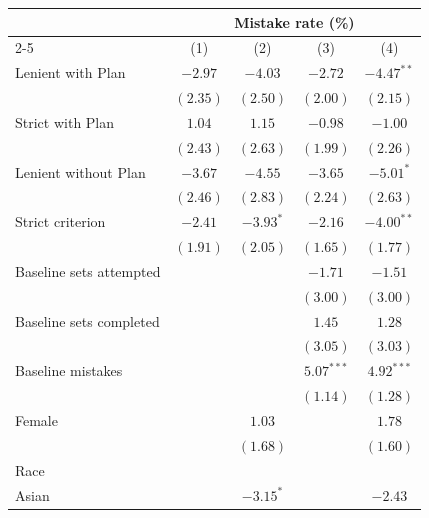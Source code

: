 \begin{tabular}{l c c c c}
\toprule
 & \multicolumn{4}{c}{Mistake rate (\%)} \\
\cmidrule(lr){2-5}
 & (1) & (2) & (3) & (4) \\
\midrule
Lenient with Plan        & $-2.97$       & $-4.03$       & $-2.72$      & $-4.47^{**}$ \\
                         & $(2.35)$      & $(2.50)$      & $(2.00)$     & $(2.15)$     \\
Strict with Plan         & $1.04$        & $1.15$        & $-0.98$      & $-1.00$      \\
                         & $(2.43)$      & $(2.63)$      & $(1.99)$     & $(2.26)$     \\
Lenient without Plan     & $-3.67$       & $-4.55$       & $-3.65$      & $-5.01^{*}$  \\
                         & $(2.46)$      & $(2.83)$      & $(2.24)$     & $(2.63)$     \\
Strict criterion         & $-2.41$       & $-3.93^{*}$   & $-2.16$      & $-4.00^{**}$ \\
                         & $(1.91)$      & $(2.05)$      & $(1.65)$     & $(1.77)$     \\
Baseline sets attempted  &               &               & $-1.71$      & $-1.51$      \\
                         &               &               & $(3.00)$     & $(3.00)$     \\
Baseline sets completed  &               &               & $1.45$       & $1.28$       \\
                         &               &               & $(3.05)$     & $(3.03)$     \\
Baseline mistakes        &               &               & $5.07^{***}$ & $4.92^{***}$ \\
                         &               &               & $(1.14)$     & $(1.28)$     \\
Female                   &               & $1.03$        &              & $1.78$       \\
                         &               & $(1.68)$      &              & $(1.60)$     \\
Race                     &               &               &              &              \\
\quad Asian              &               & $-3.15^{*}$   &              & $-2.43$      \\

\end{tabular}
